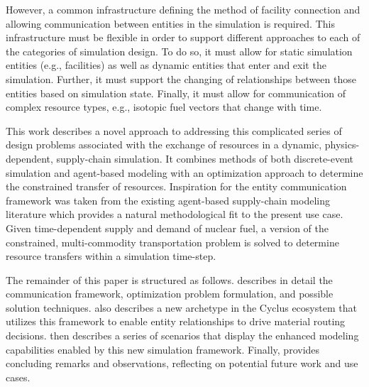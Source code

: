 However, a common infrastructure defining the method
of facility connection and allowing communication between entities in the
simulation is required. This infrastructure must be flexible in order to support
different approaches to each of the categories of simulation design. To do so,
it must allow for static simulation entities (e.g., facilities) as well as
dynamic entities that enter and exit the simulation. Further, it must support
the changing of relationships between those entities based on simulation
state. Finally, it must allow for communication of complex resource types, e.g.,
isotopic fuel vectors that change with time.

This work describes a novel approach to addressing this complicated series of
design problems associated with the exchange of resources in a dynamic,
physics-dependent, supply-chain simulation. It combines methods of both
discrete-event simulation and agent-based modeling with an optimization approach
to determine the constrained transfer of resources. Inspiration for the entity
communication framework was taken from the existing agent-based supply-chain
modeling literature
\cite{swaminathan_modeling_1998,julka_agent-based_2002,van_der_zee_modeling_2005,chatfield_multi-formalism_2007,holmgren_agent_2007}
which provides a natural methodological fit to the present use case. Given
time-dependent supply and demand of nuclear fuel, a version of the constrained,
multi-commodity transportation problem is solved to determine resource transfers
within a simulation time-step.


The remainder of this paper is structured as follows. 
describes in detail the communication framework, optimization problem
formulation, and possible solution techniques.  also
describes a new archetype in the Cyclus ecosystem that utilizes this framework
to enable entity relationships to drive material routing
decisions.  then describes a series of scenarios that
display the enhanced modeling capabilities enabled by this new simulation
framework. Finally,  provides concluding remarks and
observations, reflecting on potential future work and use cases.
